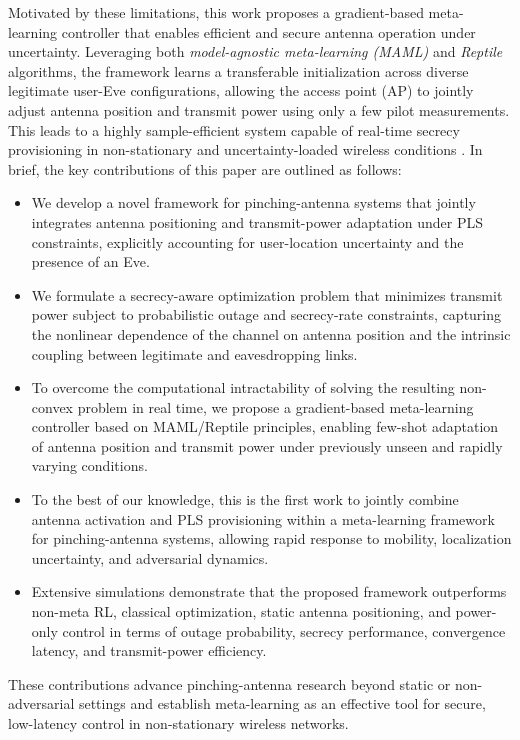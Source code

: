 \documentclass[journal,10pt]{IEEEtran}
\begin{document}
Motivated by these limitations, this work proposes a gradient-based meta-learning controller that enables efficient and secure antenna operation under uncertainty. Leveraging both \textit{model-agnostic meta-learning (MAML)} \cite{finn2017model} and \textit{Reptile} \cite{nichol2018first} algorithms, the framework learns a transferable initialization across diverse legitimate user-Eve configurations, allowing the access point (AP) to jointly adjust antenna position and transmit power using only a few pilot measurements. This leads to a highly sample-efficient system capable of real-time secrecy provisioning in non-stationary and uncertainty-loaded wireless conditions \cite{10542646, zhu2024robust}. In brief, the key contributions of this paper are outlined as follows:
\begin{itemize}
    \item We develop a novel framework for pinching-antenna systems that jointly integrates antenna positioning and transmit-power adaptation under PLS constraints, explicitly accounting for user-location uncertainty and the presence of an Eve.

    \item We formulate a secrecy-aware optimization problem that minimizes transmit power subject to probabilistic outage and secrecy-rate constraints, capturing the nonlinear dependence of the channel on antenna position and the intrinsic coupling between legitimate and eavesdropping links.

    \item To overcome the computational intractability of solving the resulting non-convex problem in real time, we propose a gradient-based meta-learning controller based on MAML/Reptile principles, enabling few-shot adaptation of antenna position and transmit power under previously unseen and rapidly varying conditions.

    \item To the best of our knowledge, this is the first work to jointly combine antenna activation and PLS provisioning within a meta-learning framework for pinching-antenna systems, allowing rapid response to mobility, localization uncertainty, and adversarial dynamics.

    \item Extensive simulations demonstrate that the proposed framework outperforms non-meta RL, classical optimization, static antenna positioning, and power-only control in terms of outage probability, secrecy performance, convergence latency, and transmit-power efficiency.
\end{itemize}
These contributions advance pinching-antenna research beyond  static or non-adversarial settings and establish meta-learning as an effective tool for secure, low-latency control in non-stationary wireless networks.
\end{document}
